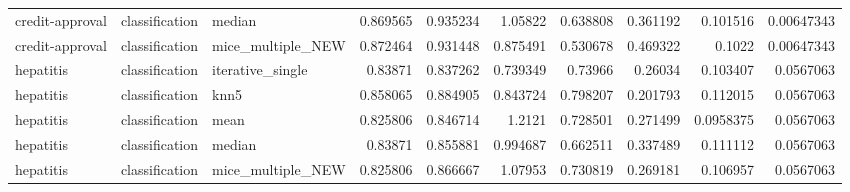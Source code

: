 \begin{table}[ht]
\begin{tabular}{lllrrrrrrr}
 credit-approval & classification & median            &   0.869565 & 0.935234 &               1.05822  &                       0.638808 &                         0.361192 &               0.101516  &                           0.00647343 \\
 credit-approval & classification & mice\_multiple\_NEW &   0.872464 & 0.931448 &               0.875491 &                       0.530678 &                         0.469322 &               0.1022    &                           0.00647343 \\
 hepatitis       & classification & iterative\_single  &   0.83871  & 0.837262 &               0.739349 &                       0.73966  &                         0.26034  &               0.103407  &                           0.0567063  \\
 hepatitis       & classification & knn5              &   0.858065 & 0.884905 &               0.843724 &                       0.798207 &                         0.201793 &               0.112015  &                           0.0567063  \\
 hepatitis       & classification & mean              &   0.825806 & 0.846714 &               1.2121   &                       0.728501 &                         0.271499 &               0.0958375 &                           0.0567063  \\
 hepatitis       & classification & median            &   0.83871  & 0.855881 &               0.994687 &                       0.662511 &                         0.337489 &               0.111112  &                           0.0567063  \\
 hepatitis       & classification & mice\_multiple\_NEW &   0.825806 & 0.866667 &               1.07953  &                       0.730819 &                         0.269181 &               0.106957  &                           0.0567063  \\
\hline
\end{tabular}
\end{table}
